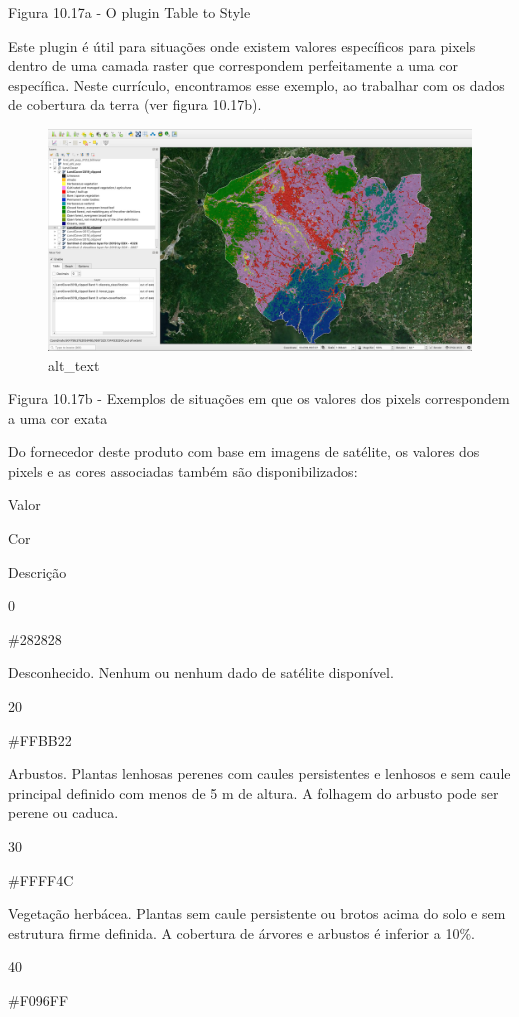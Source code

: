 \documentclass[
]{book}
\begin{document}
Figura 10.17a - O plugin Table to Style

Este plugin é útil para situações onde existem valores específicos para pixels dentro de uma camada raster que correspondem perfeitamente a uma cor específica. Neste currículo, encontramos esse exemplo, ao trabalhar com os dados de cobertura da terra (ver figura 10.17b).

\begin{figure}
\centering
\includegraphics{media/modulo10/fig1017_b.png}
\caption{alt\_text}
\end{figure}

Figura 10.17b - Exemplos de situações em que os valores dos pixels correspondem a uma cor exata

Do fornecedor deste produto com base em imagens de satélite, os valores dos pixels e as cores associadas também são disponibilizados:

Valor

Cor

Descrição

0

\#282828

Desconhecido. Nenhum ou nenhum dado de satélite disponível.

20

\#FFBB22

Arbustos. Plantas lenhosas perenes com caules persistentes e lenhosos e sem caule principal definido com menos de 5 m de altura. A folhagem do arbusto pode ser perene ou caduca.

30

\#FFFF4C

Vegetação herbácea. Plantas sem caule persistente ou brotos acima do solo e sem estrutura firme definida. A cobertura de árvores e arbustos é inferior a 10\%.

40

\#F096FF
\end{document}

